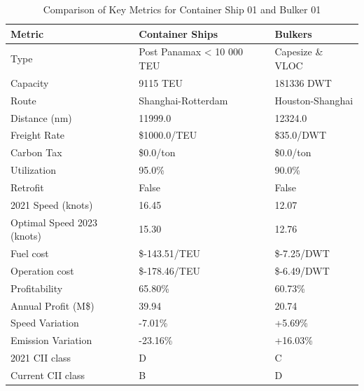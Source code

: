 \documentclass[a4paper,12pt]{article}
\begin{document}
\begin{table}[ht]
	\caption{Comparison of Key Metrics for Container Ship 01 and Bulker 01}
	\centering
	\begin{tabular}{l|l|l}
		\hline
		\textbf{Metric}            & \textbf{Container Ships}  & \textbf{Bulkers} \\
		\hline
		Type                       & Post Panamax < 10 000 TEU & Capesize \& VLOC \\
		Capacity                   & 9115 TEU                  & 181336 DWT       \\
		Route                      & Shanghai-Rotterdam        & Houston-Shanghai \\
		Distance (nm)              & 11999.0                   & 12324.0          \\
		Freight Rate               & \$1000.0/TEU              & \$35.0/DWT       \\
		Carbon Tax                 & \$0.0/ton                 & \$0.0/ton        \\
		Utilization                & 95.0\%                    & 90.0\%           \\
		Retrofit                   & False                     & False            \\
		2021 Speed (knots)         & 16.45                     & 12.07            \\
		Optimal Speed 2023 (knots) & 15.30                     & 12.76            \\
		Fuel cost                  & \$-143.51/TEU             & \$-7.25/DWT      \\
		Operation cost             & \$-178.46/TEU             & \$-6.49/DWT      \\
		Profitability              & 65.80\%                   & 60.73\%          \\
		Annual Profit (M\$)        & 39.94                     & 20.74            \\
		Speed Variation            & -7.01\%                   & +5.69\%          \\
		Emission Variation         & -23.16\%                  & +16.03\%         \\
		2021 CII class             & D                         & C                \\
		Current CII class          & B                         & D                \\
		\hline
	\end{tabular}
	\label{table:comparison}
\end{table}
\end{document}
